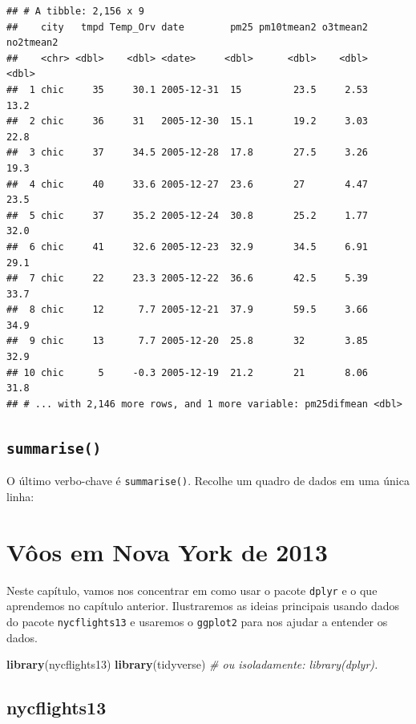 \documentclass[a4paper]{book}
\newenvironment{Shaded}{\begin{snugshade}}{\end{snugshade}}
\newcommand{\CommentTok}[1]{\textcolor[rgb]{0.56,0.35,0.01}{\textit{#1}}}
\newcommand{\KeywordTok}[1]{\textcolor[rgb]{0.13,0.29,0.53}{\textbf{#1}}}
\newcommand{\NormalTok}[1]{#1}
\begin{document}
\begin{verbatim}
## # A tibble: 2,156 x 9
##    city   tmpd Temp_Orv date        pm25 pm10tmean2 o3tmean2 no2tmean2
##    <chr> <dbl>    <dbl> <date>     <dbl>      <dbl>    <dbl>     <dbl>
##  1 chic     35     30.1 2005-12-31  15         23.5     2.53      13.2
##  2 chic     36     31   2005-12-30  15.1       19.2     3.03      22.8
##  3 chic     37     34.5 2005-12-28  17.8       27.5     3.26      19.3
##  4 chic     40     33.6 2005-12-27  23.6       27       4.47      23.5
##  5 chic     37     35.2 2005-12-24  30.8       25.2     1.77      32.0
##  6 chic     41     32.6 2005-12-23  32.9       34.5     6.91      29.1
##  7 chic     22     23.3 2005-12-22  36.6       42.5     5.39      33.7
##  8 chic     12      7.7 2005-12-21  37.9       59.5     3.66      34.9
##  9 chic     13      7.7 2005-12-20  25.8       32       3.85      32.9
## 10 chic      5     -0.3 2005-12-19  21.2       21       8.06      31.8
## # ... with 2,146 more rows, and 1 more variable: pm25difmean <dbl>
\end{verbatim}

\hypertarget{summarise}{%
\section{\texorpdfstring{\texttt{summarise()}}{summarise()}}\label{summarise}}

O último verbo-chave é \texttt{summarise()}. Recolhe um quadro de dados em uma única linha:

\hypertarget{application}{%
\chapter{Vôos em Nova York de 2013}\label{application}}

Neste capítulo, vamos nos concentrar em como usar o pacote \texttt{dplyr} e o que aprendemos no capítulo anterior. Ilustraremos as ideias principais usando dados do pacote \texttt{nycflights13} e usaremos o \texttt{ggplot2} para nos ajudar a entender os dados.

\begin{Shaded}
\begin{Highlighting}[]
\KeywordTok{library}\NormalTok{(nycflights13)}
\KeywordTok{library}\NormalTok{(tidyverse) }\CommentTok{# ou isoladamente: library(dplyr).}
\end{Highlighting}
\end{Shaded}

\hypertarget{nycflights13}{%
\section{nycflights13}\label{nycflights13}}
\end{document}
